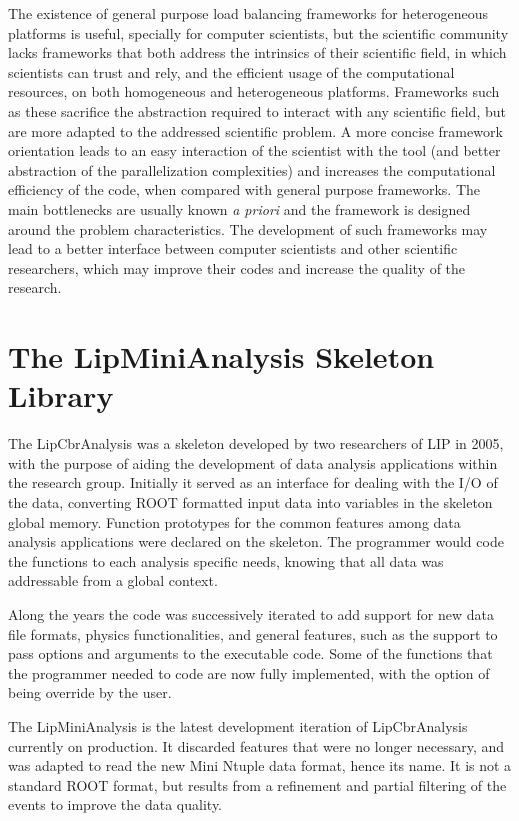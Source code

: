 The existence of general purpose load balancing frameworks for heterogeneous platforms is useful, specially for computer scientists, but the scientific community lacks frameworks that both address the intrinsics of their scientific field, in which scientists can trust and rely, and the efficient usage of the computational resources, on both homogeneous and heterogeneous platforms. Frameworks such as these sacrifice the abstraction required to interact with any scientific field, but are more adapted to the addressed scientific problem. A more concise framework orientation leads to an easy interaction of the scientist with the tool (and better abstraction of the parallelization complexities) and increases the computational efficiency of the code, when compared with general purpose frameworks. The main bottlenecks are usually known \textit{a priori} and the framework is designed around the problem characteristics. The development of such frameworks may lead to a better interface between computer scientists and other scientific researchers, which may improve their codes and increase the quality of the research.

\section{The LipMiniAnalysis Skeleton Library}
\label{lipminianalysis}

The LipCbrAnalysis was a skeleton developed by two researchers of LIP in 2005, with the purpose of aiding the development of data analysis applications within the research group. Initially it served as an interface for dealing with the I/O of the data, converting ROOT formatted input data into variables in the skeleton global memory. Function prototypes for the common features among data analysis applications were declared on the skeleton. The programmer would code the functions to each analysis specific needs, knowing that all data was addressable from a global context.

Along the years the code was successively iterated to add support for new data file formats, physics functionalities, and general features, such as the support to pass options and arguments to the executable code. Some of the functions that the programmer needed to code are now fully implemented, with the option of being override by the user.

The LipMiniAnalysis is the latest development iteration of LipCbrAnalysis currently on production. It discarded features that were no longer necessary, and was adapted to read the new Mini Ntuple data format, hence its name. It is not a standard ROOT format, but results from a refinement and partial filtering of the events to improve the data quality.


